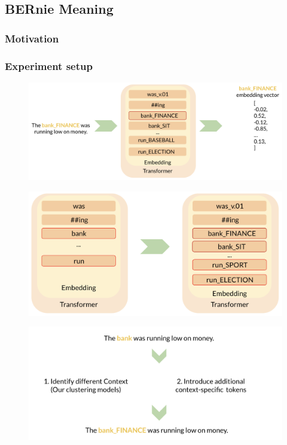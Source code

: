 \documentclass[a4paper,12pt,twoside,openright]{report}
\begin{document}
\subsection{BERnie Meaning}

\subsubsection{Motivation}

\subsubsection{Experiment setup}

\begin{figure}[h]
	\center
  \includegraphics[width=\linewidth]{./assets/experiments/pipeline_model_BERnie_meaning.png}
  \caption{}
  \label{fig:cbow_skipgram}
\end{figure}


\begin{figure}[h]
	\center
  \includegraphics[width=\linewidth]{./assets/experiments/pipeline_model_BERnie_meaning_embedding.png}
  \caption{}
  \label{fig:cbow_skipgram}
\end{figure}


\begin{figure}[h]
	\center
  \includegraphics[width=\linewidth]{./assets/experiments/pipeline_tokenizer_BERnie_meaning.png}
  \caption{}
  \label{fig:cbow_skipgram}
\end{figure}
\end{document}
